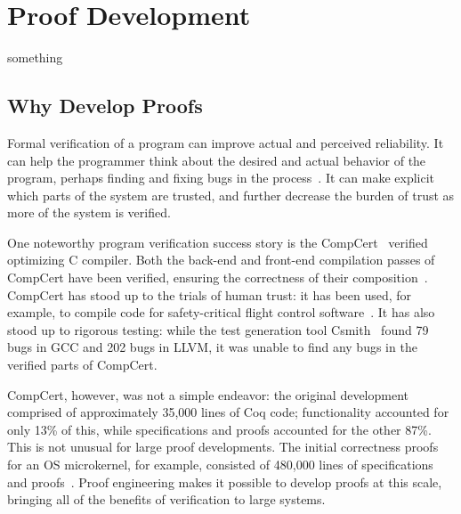 
\section{Proof Development}


something

\subsection{Why Develop Proofs}


Formal verification of a program can improve actual and perceived reliability.
It can help the programmer think about the desired and actual behavior of the program,
perhaps finding and fixing bugs in the process~\cite{murraybp}.
It can make explicit which parts of the system are trusted, and further decrease the burden
of trust as more of the system is verified.

One noteworthy program verification success story is the CompCert~\cite{Leroy:POPL06, Leroy2009} verified optimizing C compiler.
Both the back-end and front-end compilation passes
of CompCert have been verified, ensuring the correctness of their composition~\cite{Kaestner2017}.
CompCert has stood up to the trials of human trust: it has been used, for example, to compile code for safety-critical flight control software~\cite{Frana2011}.
It has also stood up to rigorous testing: while the test generation tool Csmith~\cite{Yang2011} found 
79 bugs in GCC and 202 bugs in LLVM, it was unable to find any bugs in the verified parts of CompCert.

CompCert, however, was not a simple endeavor: the original development comprised of approximately 35,000 lines of Coq code;
functionality accounted for only 13\% of this, while specifications and proofs accounted for the other 87\%.
This is not unusual for large proof developments. The initial correctness proofs for an OS microkernel,
for example, consisted of 480,000 lines of specifications and proofs~\cite{Klein2014micro}.
Proof engineering makes it possible to develop proofs at this scale,
bringing all of the benefits of verification to large systems.

